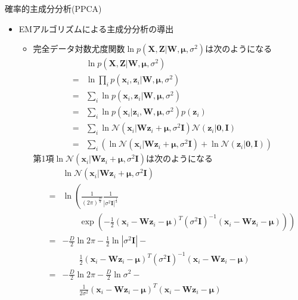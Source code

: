 \documentclass[dvipdfmx,notheorems,t]{beamer}
\begin{document}
\begin{frame}{確率的主成分分析(PPCA)}

\begin{itemize}
	\item EMアルゴリズムによる主成分分析の導出
	\begin{itemize}
		\item 完全データ対数尤度関数$\ln p(\bm{X}, \bm{Z} | \bm{W}, \bm{\mu}, \sigma^2)$は次のようになる
		\begin{eqnarray}
			&& \ln p(\bm{X}, \bm{Z} | \bm{W}, \bm{\mu}, \sigma^2) \nonumber \\
			&=& \ln \prod_i p(\bm{x}_i, \bm{z}_i | \bm{W}, \bm{\mu}, \sigma^2) \nonumber \\
			&=& \sum_i \ln p(\bm{x}_i, \bm{z}_i | \bm{W}, \bm{\mu}, \sigma^2) \nonumber \\
			&=& \sum_i \ln p(\bm{x}_i | \bm{z}_i, \bm{W}, \bm{\mu}, \sigma^2) p(\bm{z}_i) \nonumber \\
			&=& \sum_i \ln \mathcal{N}(\bm{x}_i | \bm{W} \bm{z}_i + \bm{\mu}, \sigma^2 \bm{I}) \mathcal{N}(\bm{z}_i | \bm{0}, \bm{I}) \nonumber \\
			&=& \sum_i \left( \ln \mathcal{N}(\bm{x}_i | \bm{W} \bm{z}_i + \bm{\mu}, \sigma^2 \bm{I}) + \ln \mathcal{N}(\bm{z}_i | \bm{0}, \bm{I}) \right)
		\end{eqnarray}
		第1項$\ln \mathcal{N}(\bm{x}_i | \bm{W} \bm{z}_i + \bm{\mu}, \sigma^2 \bm{I})$は次のようになる
		\begin{eqnarray}
			&& \ln \mathcal{N}(\bm{x}_i | \bm{W} \bm{z}_i + \bm{\mu}, \sigma^2 \bm{I}) \nonumber \\
			&=& \ln \left( \frac{1}{(2\pi)^\frac{D}{2}} \frac{1}{|\sigma^2 \bm{I}|^\frac{1}{2}} \right. \nonumber \\
			&& \qquad \left. \exp \left( -\frac{1}{2} \left( \bm{x}_i - \bm{W} \bm{z}_i - \bm{\mu} \right)^T \left( \sigma^2 \bm{I} \right)^{-1} \left( \bm{x}_i - \bm{W} \bm{z}_i - \bm{\mu} \right) \right) \right) \nonumber \\
			&=& -\frac{D}{2} \ln 2\pi - \frac{1}{2} \ln |\sigma^2 \bm{I}| - \nonumber \\
			&& \qquad \frac{1}{2} \left( \bm{x}_i - \bm{W} \bm{z}_i - \bm{\mu} \right)^T \left( \sigma^2 \bm{I} \right)^{-1} \left( \bm{x}_i - \bm{W} \bm{z}_i - \bm{\mu} \right) \nonumber \\
			&=& -\frac{D}{2} \ln 2\pi - \frac{D}{2} \ln \sigma^2 - \nonumber \\
			&& \qquad \frac{1}{2 \sigma^2} \left( \bm{x}_i - \bm{W} \bm{z}_i - \bm{\mu} \right)^T \left( \bm{x}_i - \bm{W} \bm{z}_i - \bm{\mu} \right) \nonumber \\

\end{eqnarray}
\end{itemize}
\end{itemize}
\end{frame}
\end{document}
